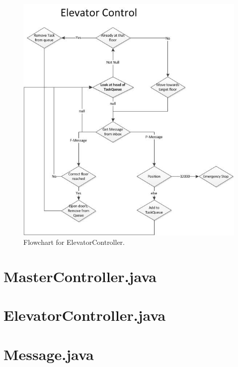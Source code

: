 \begin{appendix}
\begin{figure}[h!]
\begin{center}
\includegraphics{FlowChart/ElevatorControll.jpg}
\caption{Flowchart for ElevatorController.}
\label{chart:controller}
\end{center}
\end{figure}

\cleardoublepage
\section{MasterController.java}
\label{code:master}


\section{ElevatorController.java}
\label{code:controller}


\section{Message.java}
\label{code:message}

\end{appendix}
